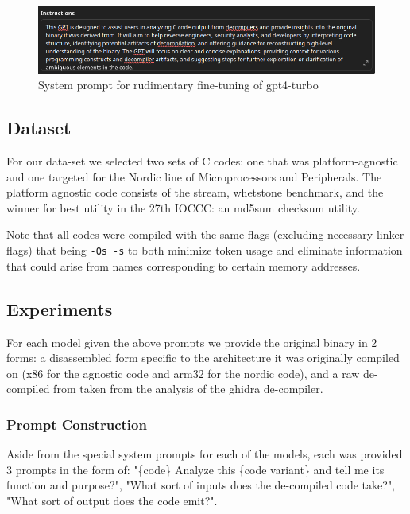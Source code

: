 \begin{figure}[!htb]
    \centering
    \includegraphics[width=0.9\linewidth]{2024-12-13-22-13-20-ChatGPT_Mozilla_Firefox.jpg}
    \caption{System prompt for rudimentary fine-tuning of gpt4-turbo}
    \label{fig:system}
\end{figure}

\subsection{Dataset}

For our data-set we selected two sets of C codes: one that was platform-agnostic
and one targeted for the Nordic line of Microprocessors and Peripherals. The platform agnostic code consists of the stream, whetstone benchmark, and the winner for best utility in the 27th IOCCC: an md5sum checksum utility. \cite{iocccilya} 

Note that all codes were compiled with the same flags (excluding necessary linker flags) that being \verb|-Os -s| to both minimize token usage and eliminate information that could arise from names corresponding to certain memory addresses. 

\subsection{Experiments}

For each model given the above prompts we provide the original binary in 2 forms: a disassembled form specific to the architecture it was originally compiled on (x86 for the agnostic code and arm32 for the nordic code), and a raw de-compiled from taken from the analysis of the ghidra de-compiler. 

\subsubsection{Prompt Construction}

Aside from the special system prompts for each of the models, each was provided 3 prompts in the form of: "\{code\} Analyze this \{code variant\} and tell me its function and purpose?", "What sort of inputs does the de-compiled code take?", "What sort of output does the code emit?".

